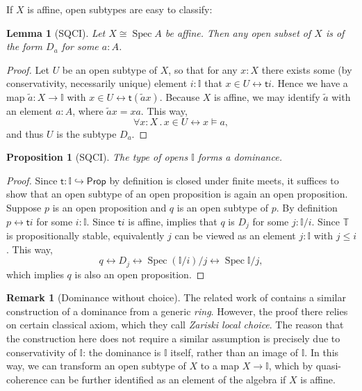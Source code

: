 \documentclass[12pt]{amsart}
\newtheorem{lemma}[theorem]{Lemma}
\newtheorem{proposition}[theorem]{Proposition}
\theoremstyle{definition}
\newtheorem{remark}[theorem]{Remark}
\newcommand{\mbb}[1]{\mathbb{#1}}
\newcommand{\T}{\mbb T}
\newcommand{\I}{\mbb I}
\newcommand{\ms}[1]{\mathsf{#1}}
\newcommand{\qsi}[1]{\tilde{#1}}
\newcommand{\hook}{\hookrightarrow}
\newcommand{\fa}[2]{\forall #1\!\colon\!\!#2\mathpunct{.}}
\newcommand{\eq}{\leftrightarrow}
\newcommand{\pp}{\ms{Prop}}
\newcommand{\spec}{\operatorname{Spec}}
\begin{document}
If $X$ is affine, open subtypes are easy to classify:

\begin{lemma}[SQCI]\label{lem:openofaffinegivesalgebra}
  Let $X \cong \spec A$ be affine. Then any open subset of $X$ is of the form $D_a$ for some $a:A$.
\end{lemma}
\begin{proof}
  Let $U$ be an open subtype of $X$, so that for any $x:X$ there exists some (by conservativity, necessarily unique) element $i:\I$ that $x \in U \eq \ms ti$.
  Hence we have a map $\qsi a \colon X \to \I$ with $x \in U \eq \ms t(\qsi ax)$. Because $X$ is affine, we may identify $\qsi a$ with an element $a:A$, where $\qsi ax = xa$. This way,
  \[ \fa xX x \in U \eq x \models a, \]
  and thus $U$ is the subtype $D_a$.
\end{proof}

\begin{proposition}[SQCI]\label{prop:Idominance}
  The type of opens $\I$ forms a dominance.
\end{proposition}
\begin{proof}
  Since $\ms t \colon \I \hook \pp$ by definition is closed under finite meets, it suffices to show that an open subtype of an open proposition is again an open proposition. Suppose $p$ is an open proposition and $q$ is an open subtype of $p$. By definition $p \eq \ms ti$ for some $i:\I$. Since $\ms ti$ is affine,  implies that $q$ is $D_j$ for some $j : \I/i$. Since $\T$ is propositionally stable, equivalently $j$ can be viewed as an element $j : \I$ with $j \le i$. This way, 
  \[ q \eq D_j \eq \spec(\I/i)/j \eq \spec\I/j, \]
  which implies $q$ is also an open proposition.
\end{proof}

\begin{remark}[Dominance without choice]\label{rem:dominancewithoutchoice}
  The related work of \citet{Cherubini_Coquand_Hutzler_2024} contains a similar construction of a dominance from a generic \emph{ring}. However, the proof there relies on certain classical axiom, which they call \emph{Zariski local choice}. The reason that the construction here does not require a similar assumption is precisely due to conservativity of $\I$: the dominance is $\I$ itself, rather than an image of $\I$. In this way, we can transform an open subtype of $X$ to a map $X \to \I$, which by quasi-coherence can be further identified as an element of the algebra if $X$ is affine. 
\end{remark}
\end{document}
